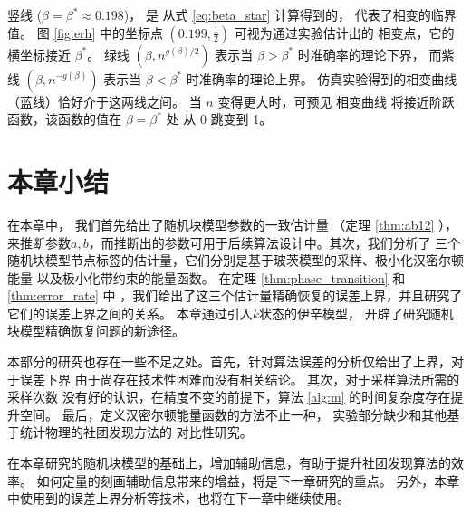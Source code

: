 竖线 ($\beta=\beta^* \approx 0.198$)，
是 从式 \eqref{eq:beta_star} 计算得到的， 
代表了相变的临界值。
图 \ref{fig:erh} 中的坐标点 $(0.199,\frac{1}{2})$
可视为通过实验估计出的
相变点，它的横坐标接近
$\beta^*$。
绿线 $(\beta, n^{g(\beta)/2})$ 
表示当 $\beta>\beta^*$ 时准确率的理论下界，
而紫线
$(\beta, n^{-g(\beta)})$ 
表示当 $\beta<\beta^*$ 时准确率的理论上界。
仿真实验得到的相变曲线（蓝线）恰好介于这两线之间。
当 $n$ 变得更大时，可预见
相变曲线 将接近阶跃函数，该函数的值在
$\beta=\beta^*$ 处
从 0 跳变到 1。



\section{本章小结}\label{sec:summary_potts}
在本章中， 
我们首先给出了随机块模型参数的一致估计量 （定理 \ref{thm:ab12} ），
来推断参数$a,b$，而推断出的参数可用于后续算法设计中。其次，我们分析了
三个随机块模型节点标签的估计量，它们分别是基于玻茨模型的采样、极小化汉密尔顿能量
以及极小化带约束的能量函数。
在定理 \ref{thm:phase_transition} 和 \ref{thm:error_rate} 中
，我们给出了这三个估计量精确恢复的误差上界，并且研究了它们的误差上界之间的关系。
本章通过引入$k$状态的伊辛模型，
开辟了研究随机块模型精确恢复问题的新途径。

本部分的研究也存在一些不足之处。首先，针对算法误差的分析仅给出了上界，对于误差下界
由于尚存在技术性困难而没有相关结论。
其次，对于采样算法所需的采样次数
没有好的认识，在精度不变的前提下，算法 \ref{alg:m} 的时间复杂度存在提升空间。
最后，定义汉密尔顿能量函数的方法不止一种，
实验部分缺少和其他基于统计物理的社团发现方法的
对比性研究。

在本章研究的随机块模型的基础上，增加辅助信息，有助于提升社团发现算法的效率。
如何定量的刻画辅助信息带来的增益，将是下一章研究的重点。
另外，本章中使用到的误差上界分析等技术，也将在下一章中继续使用。


